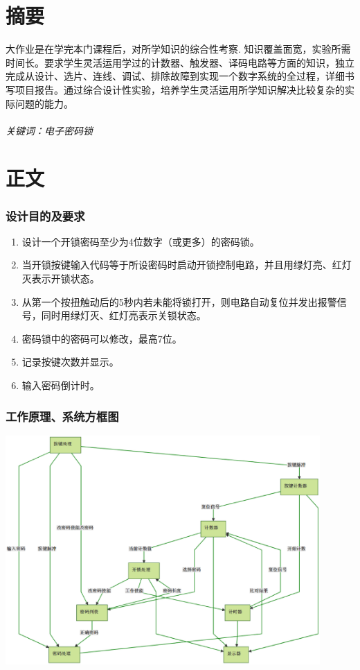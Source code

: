\documentclass[a4paper,11pt]{ctexart}
\begin{document}
\part*{摘要}大作业是在学完本门课程后，对所学知识的综合性考察. 知识覆盖面宽，实验所需时间长。要求学生灵活运用学过的计数器、触发器、译码电路等方面的知识，独立完成从设计、选片、连线、调试、排除故障到实现一个数字系统的全过程，详细书写项目报告。通过综合设计性实验，培养学生灵活运用所学知识解决比较复杂的实际问题的能力。
\paragraph{关键词：电子密码锁}

\tableofcontents            %
\newpage

\part{正文}
\section{设计目的及要求}
\begin{enumerate}
\item 设计一个开锁密码至少为4位数字（或更多）的密码锁。
\item 当开锁按键输入代码等于所设密码时启动开锁控制电路，并且用绿灯亮、红灯灭表示开锁状态。
\item 从第一个按扭触动后的5秒内若未能将锁打开，则电路自动复位并发出报警信号，同时用绿灯灭、红灯亮表示关锁状态。
\item 密码锁中的密码可以修改，最高7位。
\item 记录按键次数并显示。
\item 输入密码倒计时。
\end{enumerate}

\section{工作原理、系统方框图}
\begin{center}
\includegraphics[width=0.9\textwidth]{./images/struct.eps}
\end{center}
\end{document}
